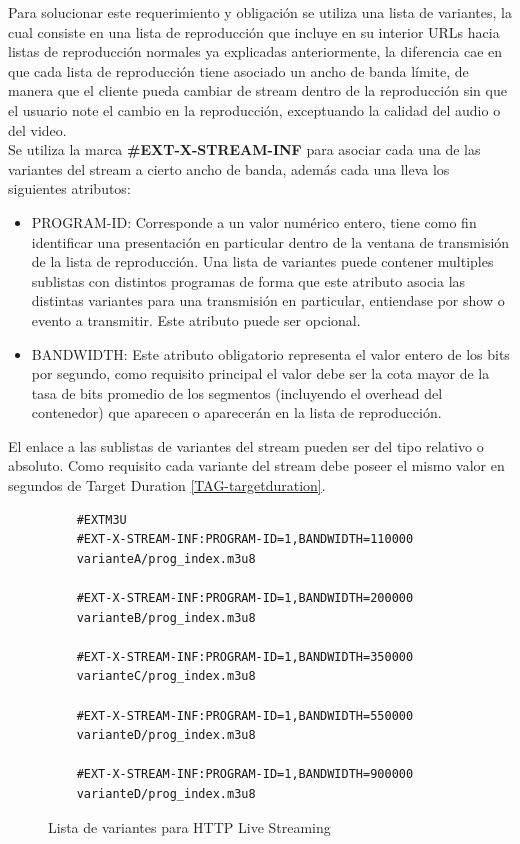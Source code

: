 Para solucionar este requerimiento y obligación se utiliza una lista de variantes, la cual consiste en una lista de reproducción que incluye en su interior URLs hacia listas de reproducción normales ya explicadas anteriormente, la diferencia cae en que cada lista de reproducción tiene asociado un ancho de banda límite, de manera que el cliente pueda cambiar de stream dentro de la reproducción sin que el usuario note el cambio en la reproducción, exceptuando la calidad del audio o del video.\\

Se utiliza la marca \textbf{\#EXT-X-STREAM-INF} para asociar cada una de las variantes del stream a cierto ancho de banda, además cada una lleva los siguientes atributos:

\begin{itemize}

\item PROGRAM-ID: Corresponde a un valor numérico entero, tiene como fin identificar una presentación en particular dentro de la ventana de transmisión de la lista de reproducción. Una lista de variantes puede contener multiples sublistas con distintos programas de forma que este atributo asocia las distintas variantes para una transmisión en particular, entiendase por show o evento a transmitir. Este atributo puede ser opcional.

\item BANDWIDTH: Este atributo obligatorio representa el valor entero de los bits por segundo, como requisito principal el valor debe ser la cota mayor de la tasa de bits promedio de los segmentos (incluyendo el overhead del contenedor) que aparecen o aparecerán en la lista de reproducción. 

\end{itemize}

El enlace a las sublistas de variantes del stream pueden ser del tipo relativo o absoluto. Como requisito cada variante del stream debe poseer el mismo valor en segundos de Target Duration \ref{TAG-targetduration}.

\begin{figure}[h!]
	\centering
	\begin{lstlisting}
	#EXTM3U
	#EXT-X-STREAM-INF:PROGRAM-ID=1,BANDWIDTH=110000
	varianteA/prog_index.m3u8
	
	#EXT-X-STREAM-INF:PROGRAM-ID=1,BANDWIDTH=200000
	varianteB/prog_index.m3u8

	#EXT-X-STREAM-INF:PROGRAM-ID=1,BANDWIDTH=350000
	varianteC/prog_index.m3u8

	#EXT-X-STREAM-INF:PROGRAM-ID=1,BANDWIDTH=550000
	varianteD/prog_index.m3u8

	#EXT-X-STREAM-INF:PROGRAM-ID=1,BANDWIDTH=900000
	varianteD/prog_index.m3u8

	\end{lstlisting}
	\caption{Lista de variantes para HTTP Live Streaming}
	\label{ejemploVariantPLS}	
\end{figure}	

